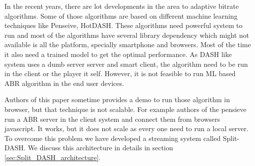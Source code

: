 In the recent years, there are lot developments in the area to adaptive bitrate algorithms. Some of those algorithms are based on different machine learning techniques like Penseive, HotDASH. These algorithms need powerful system to run and most of the algorithms have several library dependency which might not available is all the platform, specially smartphone and browsers. Most of the time it also need a trained model to get the optimal performance. As DASH like system uses a dumb server server and smart client, the algorithm need to be run in the client or the player it self. However, it is not feasible to run ML based ABR algorithm in the end user devices. 

Authors of this paper sometime provides a demo to run those algorithm in browser, but that technique is not scalable. For example authors of the pensieve run a ABR server in the client system and connect them from browsers javascript. It works, but it does not scale as every one need to run a local server. To overcome this problem we have developed a streaming system called Split-DASH. We discuss this architecture in details in section \ref{sec:Split_DASH_architecture}. 
